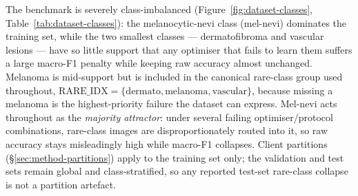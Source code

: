 \documentclass[11pt,a4paper]{report}
\begin{document}
The benchmark is severely class-imbalanced (Figure~\ref{fig:dataset-classes},
Table~\ref{tab:dataset-classes}): the melanocytic-nevi class (mel-nevi) dominates
the training set, while the two smallest classes --- dermatofibroma and vascular
lesions --- have so little support that any optimiser that fails to learn them
suffers a large macro-F1 penalty while keeping raw accuracy almost unchanged.
Melanoma is mid-support but is included in the canonical rare-class group used
throughout, $\mathrm{RARE\_IDX} = \{\text{dermato}, \text{melanoma},
\text{vascular}\}$, because missing a melanoma is the highest-priority failure the
dataset can express. Mel-nevi acts throughout as the
\emph{majority attractor}: under several failing optimiser/protocol combinations,
rare-class images are disproportionately routed into it, so raw accuracy stays
misleadingly high while macro-F1 collapses. Client partitions
(\S\ref{sec:method-partitions}) apply to the training set only; the validation and
test sets remain global and class-stratified, so any reported test-set rare-class
collapse is not a partition artefact.

\begin{table}[H]
\centering
\small
\caption{DermaMNIST class supports and roles in this thesis. Train
prevalence and test support are computed directly from the MedMNIST~v2
release; the train support totals $7007$ and the test support totals
$2005$. The rare-class group $\mathrm{RARE\_IDX} = \{\text{dermato},
\text{melanoma}, \text{vascular}\}$ defines the rare-class F1 used
throughout Chapter~\ref{ch:results}.}
\label{tab:dataset-classes}
\end{table}
\end{document}
